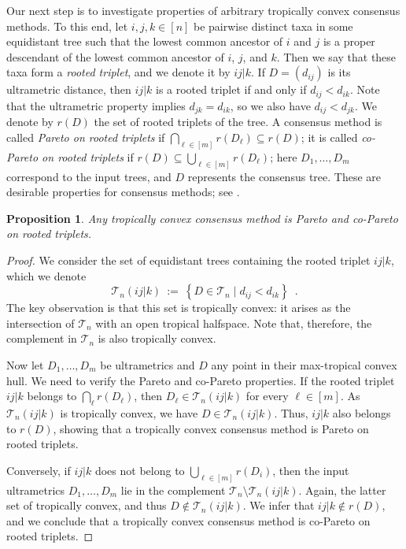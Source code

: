 \documentclass[a4paper,12pt]{amsart}
\newcommand\cT{{\mathcal T}}
\newcommand\SetOf[2]{\left\{#1 \mid #2\right\}}
\newtheorem{proposition}[theorem]{Proposition}
\theoremstyle{remark}
\begin{document}
Our next step is to investigate properties of arbitrary tropically convex consensus methods.
To this end,  let $i,j,k\in[n]$ be pairwise distinct taxa in some equidistant tree such that the lowest common ancestor of $i$ and $j$ is a proper descendant of the lowest common ancestor of $i$, $j$, and $k$.
Then we say that these taxa form a \emph{rooted triplet}, and we denote it by $ij|k$.
If $D=(d_{ij})$ is its ultrametric distance, then $ij|k$ is a rooted triplet if and only if $d_{ij}<d_{ik}$.
Note that the ultrametric property implies $d_{jk}=d_{ik}$, so we also have $d_{ij}<d_{jk}$.
We denote by $r(D)$ the set of rooted triplets of the tree.
A consensus method is called \emph{Pareto on rooted triplets} if $\bigcap_{\ell\in[m]}r(D_\ell)\subseteq r(D)$; it is called \emph{co-Pareto on rooted triplets} if $r(D)\subseteq\bigcup_{\ell\in[m]}r(D_\ell)$;
here $D_1,\dots,D_m$ correspond to the input trees, and $D$ represents the consensus tree.
These are desirable properties for consensus methods; see \cite[]{Bryant:2003}.

\begin{proposition} \label{prop:Pareto}
  Any tropically convex consensus method is Pareto and co-Pareto on rooted triplets.
\end{proposition}

\begin{proof}
  We consider the set of equidistant trees containing the rooted triplet $ij|k$, which we denote
  \[
    \cT_n(ij|k) \ := \ \SetOf{D\in\cT_n}{d_{ij}<d_{ik}} \enspace.
  \]
  The key observation is that this set is tropically convex: it arises as the intersection of $\cT_n$ with an open tropical halfspace.
  Note that, therefore, the complement in $\cT_n$ is also tropically convex.

  Now let $D_1,\dots,D_m$ be ultrametrics and $D$ any point in their max-tropical convex hull.
  We need to verify the Pareto and co-Pareto properties.
  If the rooted triplet $ij|k$ belongs to $\bigcap_{\ell}r(D_\ell)$, then $D_\ell\in\cT_n(ij|k)$ for every $\ell\in[m]$.
  As $\cT_n(ij|k)$ is tropically convex, we have  $D\in\cT_n(ij|k)$.
  Thus, $ij|k$ also belongs to $r(D)$, showing that a tropically convex consensus method is Pareto on rooted triplets.

  Conversely, if $ij|k$ does not belong to $\bigcup_{\ell\in[m]}r(D_i)$, then the input ultrametrics $D_1,\dots,D_m$ lie in the complement $\cT_n\setminus\cT_n(ij|k)$.
  Again, the latter set of tropically convex, and thus $D\notin\cT_n(ij|k)$.
  We infer that $ij|k\notin r(D)$, and we conclude that a tropically convex consensus method is co-Pareto on rooted triplets.
\end{proof}
\end{document}
